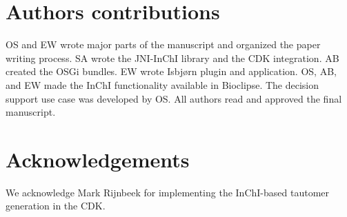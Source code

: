\documentclass[10pt]{bmc_article}
\newenvironment{bmcformat}{\fussy\setboolean{publ}{true}}{\fussy}
\begin{document}
\begin{bmcformat}
    
\section*{Authors contributions}
OS and EW wrote major parts of the manuscript and organized the paper writing process. SA wrote the JNI-InChI library and
the CDK integration. AB created the OSGi bundles. EW wrote Isbjørn plugin and application. OS, AB, and EW made the InChI
functionality available in Bioclipse. The decision support use case was developed by OS.
All authors read and approved the final manuscript.
    

\section*{Acknowledgements}
We acknowledge Mark Rijnbeek for implementing the InChI-based tautomer
generation in the CDK.

 


{
   }     %





\end{bmcformat}
\end{document}
